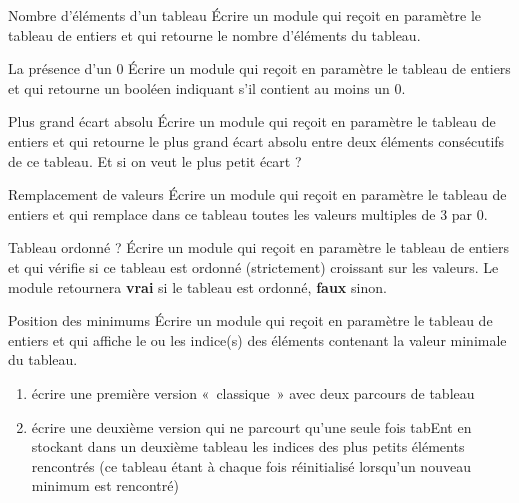 \begin{Exercice}{Nombre d'éléments d'un tableau}
	Écrire un module qui reçoit en paramètre le tableau
	 de  entiers et qui
	retourne le nombre d’éléments du tableau.
\end{Exercice}

\begin{Exercice}{La présence d'un 0}
	Écrire un module qui reçoit en paramètre le tableau
	 de  entiers 
	et qui retourne un booléen 
	indiquant s'il contient au moins un 0. 
\end{Exercice}

\begin{Exercice}{Plus grand écart absolu}
	Écrire un module qui reçoit en paramètre le tableau
	 de  entiers et qui
	retourne le plus grand écart absolu entre deux éléments consécutifs de
	ce tableau.
	Et si on veut le plus petit écart ?
\end{Exercice}

\begin{Exercice}{Remplacement de valeurs}
	Écrire un module qui reçoit en paramètre le tableau
	 de  entiers et qui
	remplace dans ce tableau toutes les valeurs multiples de 3 par 0.
\end{Exercice}

\begin{Exercice}{Tableau ordonné ?}
	Écrire un module qui reçoit en paramètre le tableau
	 de  entiers et qui
	vérifie si ce tableau est ordonné (strictement) croissant sur les
	valeurs. Le module retournera \textbf{vrai} si le tableau est ordonné,
	\textbf{faux} sinon.
\end{Exercice}

\begin{Exercice}{Position des minimums}
	Écrire un module qui reçoit en paramètre le tableau
	 de  entiers et qui
	affiche le ou les indice(s) des éléments contenant la valeur minimale
	du tableau.

	\begin{enumerate}[label=\alph*)]
	\item 
		écrire une première version «~classique~» avec deux parcours de tableau
	\item
		écrire une deuxième version qui ne parcourt qu’une seule fois tabEnt en
		stockant dans un deuxième tableau les indices des plus petits éléments
		rencontrés (ce tableau étant à chaque fois réinitialisé lorsqu’un
		nouveau minimum est rencontré)
	\end{enumerate}
\end{Exercice}

